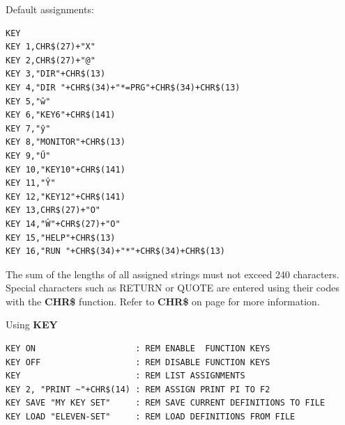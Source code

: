 \begin{description}[leftmargin=2cm,style=nextline]
                  Default assignments:

\begin{tcolorbox}[colback=black,coltext=white]
\verbatimfont{\codefont}
\begin{verbatim}
KEY
KEY 1,CHR$(27)+"X"
KEY 2,CHR$(27)+"@"
KEY 3,"DIR"+CHR$(13)
KEY 4,"DIR "+CHR$(34)+"*=PRG"+CHR$(34)+CHR$(13)
KEY 5,"ŵ"
KEY 6,"KEY6"+CHR$(141)
KEY 7,"ŷ"
KEY 8,"MONITOR"+CHR$(13)
KEY 9,"Ű"
KEY 10,"KEY10"+CHR$(141)
KEY 11,"Ŷ"
KEY 12,"KEY12"+CHR$(141)
KEY 13,CHR$(27)+"O"
KEY 14,"Ŵ"+CHR$(27)+"O"
KEY 15,"HELP"+CHR$(13)
KEY 16,"RUN "+CHR$(34)+"*"+CHR$(34)+CHR$(13)
\end{verbatim}
\end{tcolorbox}

\item [Remarks:]  The sum of the lengths of all assigned strings must not exceed 240 characters. Special characters such as RETURN or QUOTE are entered using their codes with the {\bf CHR\$} function. Refer to {\bf CHR\$} on page \pageref{BASIC 65 Functions!CHR} for more information.

\item [Examples:] Using {\bf KEY}

\begin{tcolorbox}[colback=black,coltext=white]
\verbatimfont{\codefont}
\begin{verbatim}
KEY ON                    : REM ENABLE  FUNCTION KEYS
KEY OFF                   : REM DISABLE FUNCTION KEYS
KEY                       : REM LIST ASSIGNMENTS
KEY 2, "PRINT ~"+CHR$(14) : REM ASSIGN PRINT PI TO F2
KEY SAVE "MY KEY SET"     : REM SAVE CURRENT DEFINITIONS TO FILE
KEY LOAD "ELEVEN-SET"     : REM LOAD DEFINITIONS FROM FILE
\end{verbatim}
\end{tcolorbox}
\end{description}


\newpage
